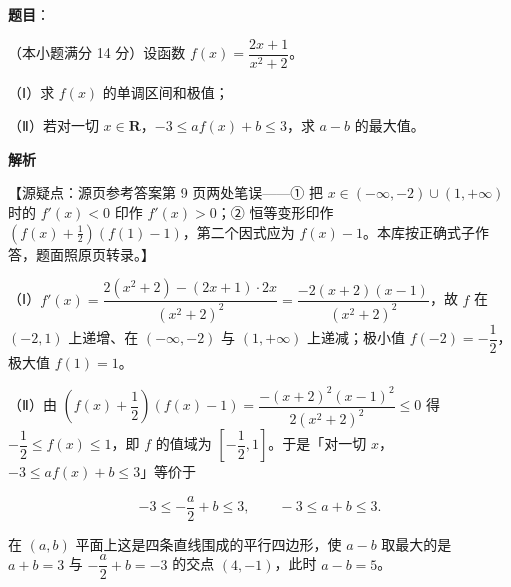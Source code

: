 \begin{answer}

\textbf{题目}：

（本小题满分 14 分）设函数 $f(x)=\dfrac{2x+1}{x^2+2}$。

（Ⅰ）求 $f(x)$ 的单调区间和极值；

（Ⅱ）若对一切 $x\in\mathbf R$，$-3\leqslant af(x)+b\leqslant3$，求 $a-b$ 的最大值。

\textbf{解析}

【源疑点：源页参考答案第 9 页两处笔误——① 把 $x\in(-\infty,-2)\cup(1,+\infty)$ 时的 $f'(x)<0$ 印作 $f'(x)>0$；② 恒等变形印作 $\left(f(x)+\frac12\right)\left(f(1)-1\right)$，第二个因式应为 $f(x)-1$。本库按正确式子作答，题面照原页转录。】

（Ⅰ）$f'(x)=\dfrac{2(x^2+2)-(2x+1)\cdot2x}{(x^2+2)^2}=\dfrac{-2(x+2)(x-1)}{(x^2+2)^2}$，故 $f$ 在 $(-2,1)$ 上递增、在 $(-\infty,-2)$ 与 $(1,+\infty)$ 上递减；极小值 $f(-2)=-\dfrac12$，极大值 $f(1)=1$。

（Ⅱ）由 $\left(f(x)+\dfrac12\right)\left(f(x)-1\right)=\dfrac{-(x+2)^2(x-1)^2}{2(x^2+2)^2}\leqslant0$ 得 $-\dfrac12\leqslant f(x)\leqslant1$，即 $f$ 的值域为 $\left[-\dfrac12,1\right]$。于是「对一切 $x$，$-3\leqslant af(x)+b\leqslant3$」等价于

\nopagebreak[4]
\[-3\leqslant-\frac a2+b\leqslant3,\qquad -3\leqslant a+b\leqslant3.\]

在 $(a,b)$ 平面上这是四条直线围成的平行四边形，使 $a-b$ 取最大的是 $a+b=3$ 与 $-\dfrac a2+b=-3$ 的交点 $(4,-1)$，此时 $a-b=5$。


\end{answer}
